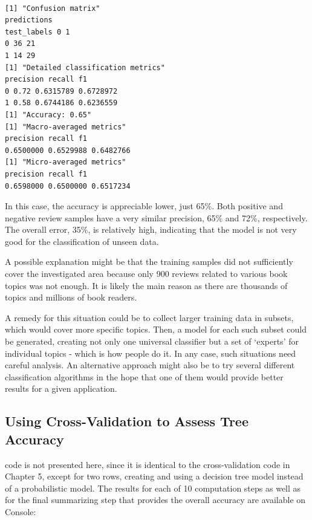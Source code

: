 \documentclass[11pt,openany,executivepaper]{book}
\begin{document}
\begin{verbatim}

[1] "Confusion matrix"
predictions
test_labels 0 1
0 36 21
1 14 29
[1] "Detailed classification metrics"
precision recall f1
0 0.72 0.6315789 0.6728972
1 0.58 0.6744186 0.6236559
[1] "Accuracy: 0.65"
[1] "Macro-averaged metrics"
precision recall f1
0.6500000 0.6529988 0.6482766
[1] "Micro-averaged metrics"
precision recall f1
0.6598000 0.6500000 0.6517234
\end{verbatim}

In this case, the accuracy is appreciable lower, just 65\%. Both positive and
negative review samples have a very similar precision, 65\% and 72\%, respectively. The overall error, 35\%, is relatively high, indicating that the model is not
very good for the classification of unseen data.

A possible explanation might be that the training samples did not sufficiently
cover the investigated area because only 900 reviews related to various book
topics was not enough. It is likely the main reason as there are thousands of
topics and millions of book readers.

A remedy for this situation could be to collect larger training data in subsets,
which would cover more specific topics. Then, a model for each such subset
could be generated, creating not only one universal classifier but a set of ‘experts’
for individual topics - which is how people do it. In any case, such situations need
careful analysis. An alternative approach might also be to try several different
classification algorithms in the hope that one of them would provide better results
for a given application.

\subsection{Using Cross-Validation to Assess Tree Accuracy}

code is not presented here, since it is identical to the cross-validation code in
Chapter 5, except for two rows, creating and using a decision tree model instead
of a probabilistic model. The results for each of 10 computation steps as well as
for the final summarizing step that provides the overall accuracy are available on
Console:
\end{document}
